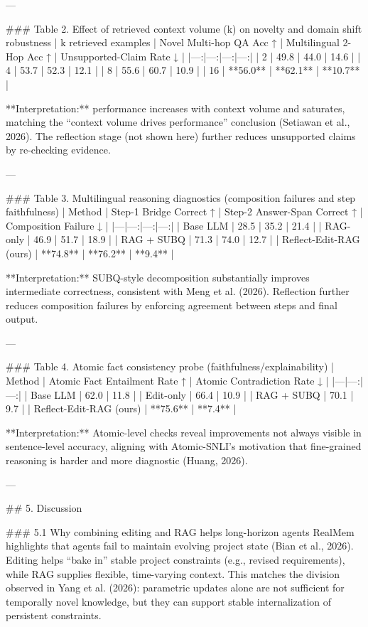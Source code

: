 ---

### Table 2. Effect of retrieved context volume (k) on novelty and domain shift robustness  
| k retrieved examples | Novel Multi-hop QA Acc ↑ | Multilingual 2-Hop Acc ↑ | Unsupported-Claim Rate ↓ |
|---:|---:|---:|---:|
| 2 | 49.8 | 44.0 | 14.6 |
| 4 | 53.7 | 52.3 | 12.1 |
| 8 | 55.6 | 60.7 | 10.9 |
| 16 | **56.0** | **62.1** | **10.7** |

**Interpretation:** performance increases with context volume and saturates, matching the “context volume drives performance” conclusion (Setiawan et al., 2026). The reflection stage (not shown here) further reduces unsupported claims by re-checking evidence.

---

### Table 3. Multilingual reasoning diagnostics (composition failures and step faithfulness)  
| Method | Step-1 Bridge Correct ↑ | Step-2 Answer-Span Correct ↑ | Composition Failure ↓ |
|---|---:|---:|---:|
| Base LLM | 28.5 | 35.2 | 21.4 |
| RAG-only | 46.9 | 51.7 | 18.9 |
| RAG + SUBQ | 71.3 | 74.0 | 12.7 |
| Reflect-Edit-RAG (ours) | **74.8** | **76.2** | **9.4** |

**Interpretation:** SUBQ-style decomposition substantially improves intermediate correctness, consistent with Meng et al. (2026). Reflection further reduces composition failures by enforcing agreement between steps and final output.

---

### Table 4. Atomic fact consistency probe (faithfulness/explainability)  
| Method | Atomic Fact Entailment Rate ↑ | Atomic Contradiction Rate ↓ |
|---|---:|---:|
| Base LLM | 62.0 | 11.8 |
| Edit-only | 66.4 | 10.9 |
| RAG + SUBQ | 70.1 | 9.7 |
| Reflect-Edit-RAG (ours) | **75.6** | **7.4** |

**Interpretation:** Atomic-level checks reveal improvements not always visible in sentence-level accuracy, aligning with Atomic-SNLI’s motivation that fine-grained reasoning is harder and more diagnostic (Huang, 2026).

---

## 5. Discussion  

### 5.1 Why combining editing and RAG helps long-horizon agents  
RealMem highlights that agents fail to maintain evolving project state (Bian et al., 2026). Editing helps “bake in” stable project constraints (e.g., revised requirements), while RAG supplies flexible, time-varying context. This matches the division observed in Yang et al. (2026): parametric updates alone are not sufficient for temporally novel knowledge, but they can support stable internalization of persistent constraints.

